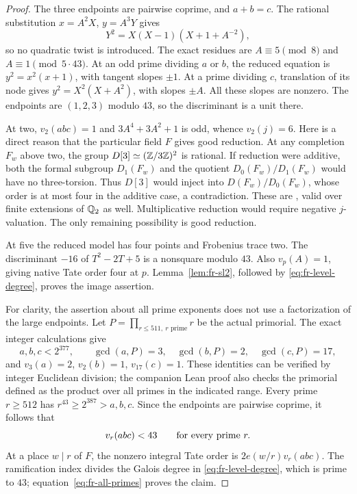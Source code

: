 \begin{proof}
The three endpoints are pairwise coprime, and $a+b=c$.
The rational substitution $x=A^2X$, $y=A^3Y$ gives
\[
 Y^2=X(X-1)(X+1+A^{-2}),
\]
so no quadratic twist is introduced. The exact residues are
$A\equiv5\pmod8$ and $A\equiv1\pmod{5\cdot43}$.
At an odd prime dividing $a$ or $b$, the reduced equation is
$y^2=x^2(x+1)$, with tangent slopes $\pm1$.
At a prime dividing $c$, translation of its node gives
$y^2=X^2(X+A^2)$, with slopes $\pm A$.
All these slopes are nonzero. The endpoints are $(1,2,3)$
modulo $43$, so the discriminant is a unit there.

At two, $v_2(abc)=1$ and $3A^4+3A^2+1$ is odd, whence
$v_2(j)=6$. Here is a direct reason that the particular field
$F$ gives good reduction. At any completion $F_w$ above two,
the group $D[3]\simeq(\mathbb Z/3\mathbb Z)^2$ is rational.
If reduction were additive, both the formal subgroup $D_1(F_w)$
and the quotient $D_0(F_w)/D_1(F_w)$ would have no three-torsion.
Thus $D[3]$ would inject into $D(F_w)/D_0(F_w)$, whose order
is at most four in the additive case, a contradiction.
These are \cite[VII.2.1, VII.3.1, VII.5.1(c), VII.6.1]{Silverman},
valid over finite extensions of $\mathbb Q_2$ as well.
Multiplicative reduction would require negative $j$-valuation.
The only remaining possibility is good reduction.

At five the reduced model has four points and Frobenius trace two.
The discriminant $-16$ of $T^2-2T+5$ is a nonsquare modulo $43$.
Also $v_p(A)=1$, giving native Tate order four at $p$.
Lemma~\ref{lem:fr-sl2}, followed by
\eqref{eq:fr-level-degree}, proves the image assertion.

For clarity, the assertion about all prime exponents does not use
a factorization of the large endpoints. Let
$P=\prod_{r\le511,\ r\text{ prime}}r$ be the actual primorial.
The exact integer calculations give
\[
 a,b,c<2^{377},\qquad
 \gcd(a,P)=3,\quad\gcd(b,P)=2,\quad\gcd(c,P)=17,
\]
and $v_3(a)=2$, $v_2(b)=1$, $v_{17}(c)=1$.
These identities can be verified by integer Euclidean division;
the companion Lean proof also checks the primorial defined as the
product over all primes in the indicated range.
Every prime $r\ge512$ has $r^{43}\ge2^{387}>a,b,c$.
Since the endpoints are pairwise coprime, it follows that
\begin{equation}\label{eq:fr-all-primes}
 v_r(abc)<43\qquad\hbox{for every prime }r.
\end{equation}
At a place $w\mid r$ of $F$, the nonzero integral Tate order is
$2e(w/r)v_r(abc)$. The ramification index divides the Galois
degree in \eqref{eq:fr-level-degree}, which is prime to $43$;
equation~\eqref{eq:fr-all-primes} proves the claim.


\end{proof}
